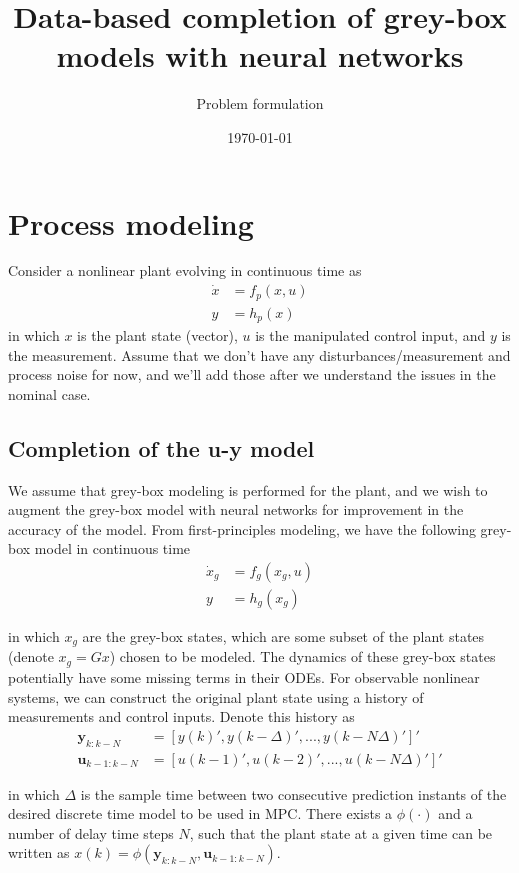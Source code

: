 \documentclass{article}
\title{Data-based completion of grey-box models with neural networks}
\author{Problem formulation}
\date{\today}
\begin{document}
\maketitle

\section{Process modeling}
Consider a nonlinear plant evolving in continuous time as
\begin{align*}
  \dot x &= f_p(x, u) \\
  y &= h_p(x)
\end{align*}
in which $x$ is the plant state (vector), $u$ is the manipulated control input,
and $y$ is the measurement. Assume that we don't have any 
disturbances/measurement and process noise 
for now, and we'll add those after we 
understand the issues in the nominal case.

\subsection{Completion of the u-y model}
We assume that grey-box modeling is performed 
for the plant, and we wish to augment the grey-box model with neural networks
for improvement in the accuracy of the model. From first-principles modeling, 
we have the following grey-box model in continuous time
\begin{align*}
  \dot{x}_g &= f_g(x_g, u) \\
  y &= h_g(x_g)
\end{align*}

in which $x_g$ are the grey-box states, which are some subset 
of the plant states (denote $x_g = Gx$) chosen to 
be modeled. The dynamics of these grey-box states 
potentially have some missing terms 
in their ODEs.
For observable nonlinear systems, 
we can construct the original plant state
using a history of measurements and control inputs.
Denote this history as 
\begin{align*}
  \mathbf{y}_{k:k-N} &= [y(k)', y(k-\Delta)', ..., y(k-N\Delta)']' \\
  \mathbf{u}_{k-1:k-N} &= [u(k-1)', u(k-2)', ..., u(k-N\Delta)']'
\end{align*}

in which $\Delta$ is the sample 
time between two consecutive
prediction instants of the desired discrete time 
model to be used in MPC. There exists a $\phi(\cdot)$ 
and a number of delay 
time steps $N$, such that the plant state
at a given time can be written as
$x(k) = \phi(\mathbf{y}_{k:k-N}, \mathbf{u}_{k-1:k-N})$.
\end{document}
